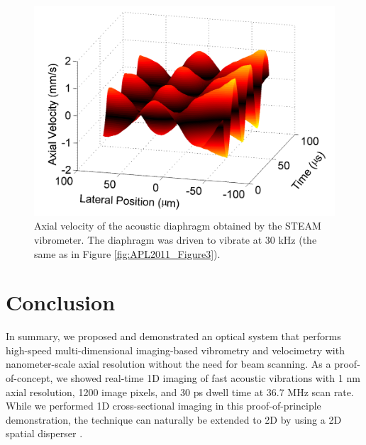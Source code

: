 \begin{figure}[htb!]
\centering
\includegraphics[scale=1]{APL2011/Figure4.png}
\caption{Axial velocity of the acoustic diaphragm obtained by the STEAM vibrometer. The diaphragm was driven to vibrate at 30 kHz (the same as in Figure \ref{fig:APL2011_Figure3}).}
\label{fig:APL2011_Figure4}
\end{figure}

\section{Conclusion}

In summary, we proposed and demonstrated an optical system that performs high-speed multi-dimensional imaging-based vibrometry and velocimetry with nanometer-scale axial resolution without the need for beam scanning. As a proof-of-concept, we showed real-time 1D imaging of fast acoustic vibrations with 1 nm axial resolution, 1200 image pixels, and 30 ps dwell time at 36.7 MHz scan rate. While we performed 1D cross-sectional imaging in this proof-of-principle demonstration, the technique can naturally be extended to 2D by using a 2D spatial disperser \cite{goda2009serial,tsia2010performance}.

